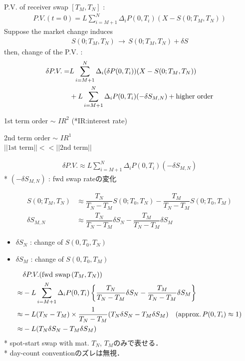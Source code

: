 \documentclass[a4paper,11pt]{jsarticle}
\theoremstyle{definition}
\newcommand{\df}[2]{\dfrac{#1}{#2}}
\begin{document}
P.V. of receiver swap $[T_M, T_N]$ :
\begin{align}
  P.V.(t=0)=L\sum_{i=M+1}^N\Delta_i P(0,T_i)(X-S(0;T_M,T_N))
\end{align}
Suppose the market change induces
\begin{align}
  S(0;T_M,T_N) \, \rightarrow \, S(0;T_M,T_N) + \delta S
\end{align}
then, change of the P.V. :
\begin{align}
  \delta P.V.=&L\sum_{i=M+1}^N\Delta_i(\delta P(0,T_i))
  (X-S(0;T_M,T_N)) \notag \\
  &+L\sum_{i=M+1}^N\Delta_i P(0,T_i)
  (-\delta S_{M,N}) + \mbox{higher order}
\end{align}

1st term order $\sim$ $IR^2$ (*IR:interest rate)\par
2nd term order $\sim$ $IR^1$ \\
$||\mbox{1st term}|| << ||\mbox{2nd term}||$

\begin{align}
  \delta P.V. \approx L\sum_{i=M+1}^N\Delta_i P(0,T_i)
  (-\delta S_{M,N})
\end{align}
* $(-\delta S_{M,N})$ : fwd swap rateの変化


\begin{align}
  S(0;T_M,T_N)&\approx\df{T_N}{T_N-T_M}S(0;T_0,T_N)
  -\df{T_M}{T_N-T_M}S(0;T_0,T_M) \\
  \delta S_{M,N}&\approx\df{T_N}{T_N-T_M}\delta S_N
  -\df{T_M}{T_N-T_M}\delta S_M
\end{align}

\begin{itemize}
  \item $\delta S_N$ : change of $S(0,T_0,T_N)$
  \item $\delta S_M$ : change of $S(0,T_0,T_M)$ 
\end{itemize}

\begin{align}
  &\delta P.V. (\mbox{fwd swap} \, (T_M,T_N)) \notag\\
  \approx& -L\sum_{i=M+1}^N\Delta_i P(0,T_i)
  \left\{\df{T_N}{T_N-T_M}\delta S_N
  -\df{T_M}{T_N-T_M}\delta S_M \right\} \notag \\
  \approx&-L(T_N-T_M)\times \df{1}{T_N-T_M}
  (T_N\delta S_N-T_M\delta S_M) \quad
  (\mbox{approx.}\, P(0,T_i)\approx 1 ) \notag \\
  \approx&-L(T_N\delta S_N-T_M \delta S_M)
\end{align}
* spot-start swap with mat. $T_N$, $T_M$のみで表せる．\\
* day-count conventionのズレは無視．
\end{document}
